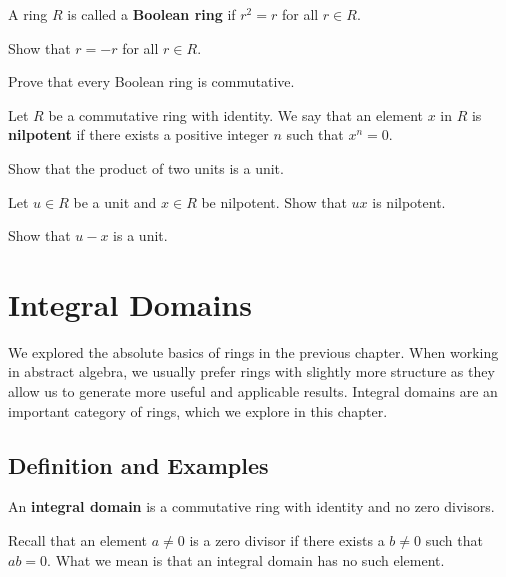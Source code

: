 \begin{problem}
    A ring $R$ is called a \textbf{Boolean ring} if $r^2 = r$ for all $r \in R$.
    \begin{partquestions}{\roman*}
        \item Show that $r = -r$ for all $r \in R$.
        \item Prove that every Boolean ring is commutative.
    \end{partquestions}
\end{problem}

\begin{problem}
    Let $R$ be a commutative ring with identity. We say that an element $x$ in $R$ is \textbf{nilpotent} if there exists a positive integer $n$ such that $x^n = 0$.
    \begin{partquestions}{\roman*}
        \item Show that the product of two units is a unit.
        \item Let $u \in R$ be a unit and $x \in R$ be nilpotent. Show that $ux$ is nilpotent.
        \item Show that $u - x$ is a unit.
    \end{partquestions}
\end{problem}

\chapter{Integral Domains}
We explored the absolute basics of rings in the previous chapter. When working in abstract algebra, we usually prefer rings with slightly more structure as they allow us to generate more useful and applicable results. Integral domains are an important category of rings, which we explore in this chapter.

\section{Definition and Examples}
\begin{definition}
    An \textbf{integral domain} is a commutative ring with identity and no zero divisors.
\end{definition}
Recall that an element $a \neq 0$ is a zero divisor if there exists a $b \neq 0$ such that $ab = 0$. What we mean is that an integral domain has no such element.

